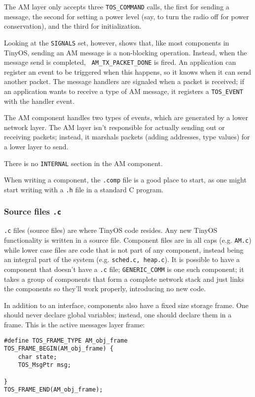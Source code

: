 \documentclass[12pt]{article}
\begin{document}
The AM layer only accepts three {\tt TOS\_COMMAND} calls, the first for
sending a message, the second for setting a power level (say, to turn
the radio off for power conservation), and the third for
initialization.

Looking at the {\tt SIGNALS} set, however, shows that, like most
components in TinyOS, sending an AM message is a non-blocking
operation. Instead, when the message send is completed, {\tt
AM\_TX\_PACKET\_DONE} is fired. An application can register an event to
be triggered when this happens, so it knows when it can send another
packet. The message handlers are signaled when a packet is received;
if an application wants to receive a type of AM message, it registers
a {\tt TOS\_EVENT} with the handler event.

The AM component handles two types of events, which are generated by a
lower network layer. The AM layer isn't responsible for actually
sending out or receiving packets; instead, it marshals packets
(adding addresses, type values) for a lower layer to send.

There is no {\tt INTERNAL} section in the AM component.

When writing a component, the {\tt .comp} file is a good place to
start, as one might start writing with a {\tt .h} file in a standard C program.

\subsubsection*{Source files {\tt .c}}

{\tt .c} files (source files) are where TinyOS code resides. Any new
TinyOS functionality is written in a source file. Component files are
in all caps (e.g. {\tt AM.c}) while lower case files are code that is
not part of any component, instead being an integral part of the
system (e.g. {\tt sched.c, heap.c}). It is possible to have a
component that doesn't have a {\tt .c} file; {\tt GENERIC\_COMM} is
one such component; it takes a group of components that form a
complete network stack and just links the components so they'll work
properly, introducing no new code.

In addition to an interface, components also have a fixed size storage
frame. One should never declare global variables; instead, one should
declare them in a frame. This is the active messages layer frame:

\begin{verbatim}
#define TOS_FRAME_TYPE AM_obj_frame
TOS_FRAME_BEGIN(AM_obj_frame) {
    char state;
    TOS_MsgPtr msg;

}
TOS_FRAME_END(AM_obj_frame);
\end{verbatim}
\end{document}
